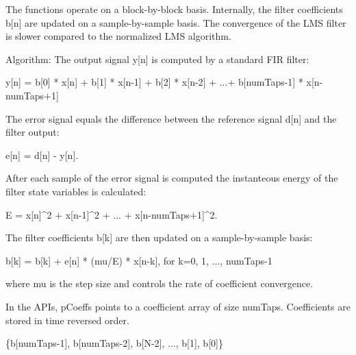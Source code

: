 The functions operate on a block-\/by-\/block basis. Internally, the filter coefficients {\ttfamily b\mbox{[}n\mbox{]}} are updated on a sample-\/by-\/sample basis. The convergence of the L\+MS filter is slower compared to the normalized L\+MS algorithm.

\begin{DoxyParagraph}{Algorithm\+:}
The output signal {\ttfamily y\mbox{[}n\mbox{]}} is computed by a standard F\+IR filter\+: 
\begin{DoxyPre}
     y[n] = b[0] * x[n] + b[1] * x[n-1] + b[2] * x[n-2] + ...+ b[numTaps-1] * x[n-numTaps+1]
 \end{DoxyPre}

\end{DoxyParagraph}
\begin{DoxyParagraph}{}
The error signal equals the difference between the reference signal {\ttfamily d\mbox{[}n\mbox{]}} and the filter output\+: 
\begin{DoxyPre}
     e[n] = d[n] - y[n].
 \end{DoxyPre}

\end{DoxyParagraph}
\begin{DoxyParagraph}{}
After each sample of the error signal is computed the instanteous energy of the filter state variables is calculated\+: 
\begin{DoxyPre}
    E = x[n]^2 + x[n-1]^2 + ... + x[n-numTaps+1]^2.
 \end{DoxyPre}
 The filter coefficients {\ttfamily b\mbox{[}k\mbox{]}} are then updated on a sample-\/by-\/sample basis\+: 
\begin{DoxyPre}
     b[k] = b[k] + e[n] * (mu/E) * x[n-k],  for k=0, 1, ..., numTaps-1
 \end{DoxyPre}
 where {\ttfamily mu} is the step size and controls the rate of coefficient convergence. 
\end{DoxyParagraph}
\begin{DoxyParagraph}{}
In the A\+P\+Is, {\ttfamily p\+Coeffs} points to a coefficient array of size {\ttfamily num\+Taps}. Coefficients are stored in time reversed order. 
\end{DoxyParagraph}
\begin{DoxyParagraph}{}

\begin{DoxyPre}
    \{b[numTaps-1], b[numTaps-2], b[N-2], ..., b[1], b[0]\}
 \end{DoxyPre}
 
\end{DoxyParagraph}
